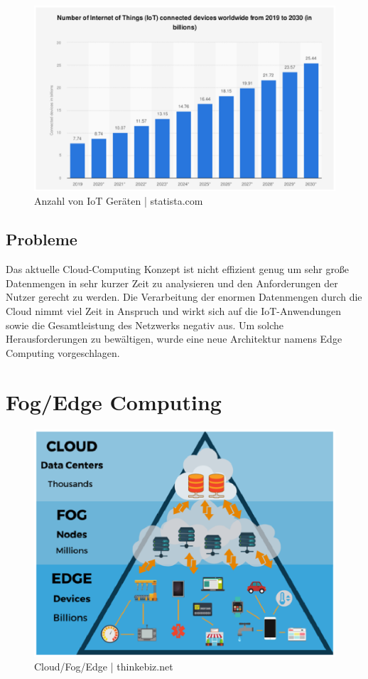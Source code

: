 \documentclass[10pt, a4paper, twocolumn]{article}
\begin{document}
\begin{figure}[H]
	\centering
	\includegraphics[scale=0.4]{Iot.eps}
	\caption{Anzahl von IoT Geräten | statista.com}
\end{figure}

\subsection{Probleme}
Das aktuelle Cloud-Computing Konzept ist nicht effizient genug um sehr große Datenmengen in sehr kurzer Zeit zu analysieren und den Anforderungen der Nutzer gerecht zu werden. Die Verarbeitung der enormen Datenmengen durch die Cloud nimmt viel Zeit in Anspruch und wirkt sich auf die IoT-Anwendungen sowie die Gesamtleistung des Netzwerks negativ aus. Um solche Herausforderungen zu bewältigen, wurde eine neue Architektur namens Edge Computing vorgeschlagen. 

\section{Fog/Edge Computing}

\begin{figure}[H]
	\centering
	\includegraphics[scale=0.4]{Fog_Edge.eps}
	\caption{Cloud/Fog/Edge | thinkebiz.net}
\end{figure}
\end{document}
